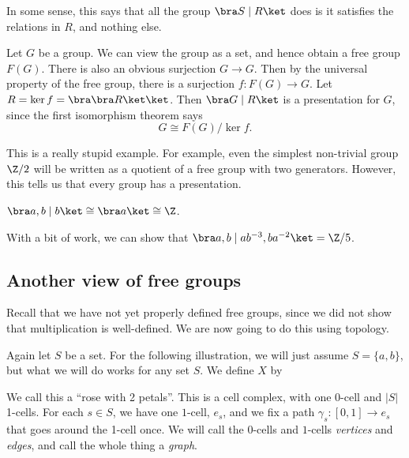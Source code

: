 \documentclass[a4paper]{article}
\begin{document}
In some sense, this says that all the group $\bra S\mid R \ket$ does is it satisfies the relations in $R$, and nothing else.

\begin{eg}
  Let $G$ be a group. We can view the group as a set, and hence obtain a free group $F(G)$. There is also an obvious surjection $G \to G$. Then by the universal property of the free group, there is a surjection $f: F(G) \to G$. Let $R = \ker f = \bra \bra R\ket \ket$. Then $\bra G \mid R \ket$ is a presentation for $G$, since the first isomorphism theorem says
  \[
    G \cong F(G) / \ker f.
  \]
\end{eg}
This is a really stupid example. For example, even the simplest non-trivial group $\Z/2$ will be written as a quotient of a free group with two generators. However, this tells us that every group has a presentation.

\begin{eg}
  $\bra a, b\mid b \ket \cong \bra a\ket \cong \Z$.
\end{eg}

\begin{eg}
  With a bit of work, we can show that $\bra a, b\mid ab^{-3}, ba^{-2}\ket = \Z/5$.
\end{eg}

\subsection{Another view of free groups}
Recall that we have not yet properly defined free groups, since we did not show that multiplication is well-defined. We are now going to do this using topology.

Again let $S$ be a set. For the following illustration, we will just assume $S = \{ a, b\}$, but what we will do works for any set $S$. We define $X$ by
\begin{center}
\end{center}
We call this a ``rose with 2 petals''. This is a cell complex, with one $0$-cell and $|S|$ 1-cells. For each $s \in S$, we have one $1$-cell, $e_s$, and we fix a path $\gamma_s: [0, 1] \to e_s$ that goes around the 1-cell once. We will call the $0$-cells and $1$-cells \emph{vertices} and \emph{edges}, and call the whole thing a \emph{graph}.
\end{document}
